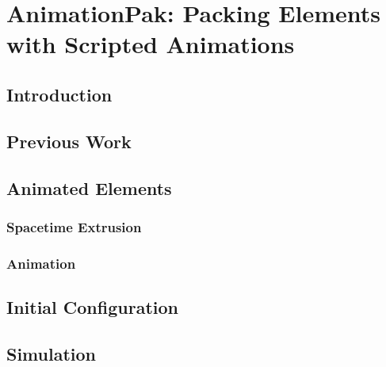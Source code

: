 \chapter{AnimationPak: Packing Elements with Scripted Animations}


\section{Introduction}


\section{Previous Work}


\section{Animated Elements}


\subsection{Spacetime Extrusion}


\subsection{Animation}


\section{Initial Configuration}


\section{Simulation}


